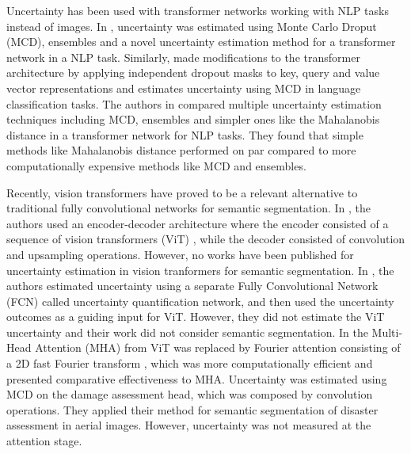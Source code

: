 Uncertainty has been used with transformer networks working with NLP tasks instead of images. In \cite{pei2022transformer}, uncertainty was estimated using Monte Carlo Droput (MCD), ensembles and a novel uncertainty estimation method for a transformer network in a NLP task. Similarly, \cite{sankararaman2022bayesformer} made modifications to the transformer architecture by applying independent dropout masks to key, query and value vector representations and estimates uncertainty using MCD in language classification tasks. The authors in \cite{vazhentsev2022uncertainty} compared multiple uncertainty estimation techniques including MCD, ensembles and simpler ones like the Mahalanobis distance in a transformer network for NLP tasks. They found that simple methods like Mahalanobis distance performed on par compared to more computationally expensive methods like MCD and ensembles.

Recently, vision transformers have proved to be a relevant alternative to traditional fully convolutional networks for semantic segmentation. In \cite{ranftl2021vision}, the authors used an encoder-decoder architecture where the encoder consisted of a sequence of vision transformers (ViT) \cite{dosovitskiy2020image}, while the decoder consisted of convolution and upsampling operations. However, no works have been published for uncertainty estimation in vision tranformers for semantic segmentation. In \cite{yang2021uncertainty}, the authors estimated uncertainty using a separate Fully Convolutional Network (FCN) called uncertainty quantification network, and then used the uncertainty outcomes as a guiding input for ViT. However, they did not estimate the ViT uncertainty and their work did not consider semantic segmentation. In \cite{bin2022efficient} the Multi-Head Attention (MHA) from ViT was replaced by Fourier attention consisting of a 2D fast Fourier transform \cite{lee2021fnet}, which was more computationally efficient and presented comparative effectiveness to MHA. Uncertainty was estimated using MCD on the damage assessment head, which was composed by convolution operations. They applied their method for semantic segmentation of disaster assessment in aerial images. However, uncertainty was not measured at the attention stage.

